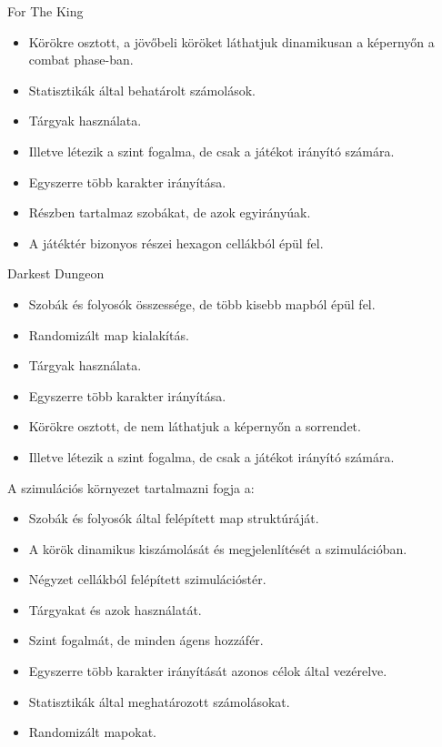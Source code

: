 \noindent For The King

\begin{itemize}
    \item Körökre osztott, a jövőbeli köröket láthatjuk dinamikusan a képernyőn a combat phase-ban.
    \item Statisztikák által behatárolt számolások.
    \item Tárgyak használata.
    \item Illetve létezik a szint fogalma, de csak a játékot irányító számára.
    \item Egyszerre több karakter irányítása.
    \item Részben tartalmaz szobákat, de azok egyirányúak.
    \item A játéktér bizonyos részei hexagon cellákból épül fel.
\end{itemize}

\noindent Darkest Dungeon

\begin{itemize}
    \item Szobák és folyosók összessége, de több kisebb mapból épül fel.
    \item Randomizált map kialakítás.
    \item Tárgyak használata.
    \item Egyszerre több karakter irányítása.
    \item Körökre osztott, de nem láthatjuk a képernyőn a sorrendet.
    \item Illetve létezik a szint fogalma, de csak a játékot irányító számára.
\end{itemize}

\noindent A szimulációs környezet tartalmazni fogja a:

\begin{itemize}
    \item Szobák és folyosók által felépített map struktúráját.
    \item A körök dinamikus kiszámolását és megjelenlítését a szimulációban.
    \item Négyzet cellákból felépített szimulációstér.
    \item Tárgyakat és azok használatát.
    \item Szint fogalmát, de minden ágens hozzáfér.
    \item Egyszerre több karakter irányítását azonos célok által vezérelve.
    \item Statisztikák által meghatározott számolásokat.
    \item Randomizált mapokat.
\end{itemize}

